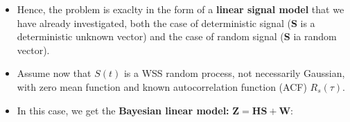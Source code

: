 \begin{itemize}
$$
\underbrace{\left[
\begin{array}{c}
Z_0 \\
Z_1 \\
Z_2 \\
\vdots \\
Z_{N-1}
\end{array}
\right]}_{\mathbf{Z}}
=
\underbrace{\left[
\begin{array}{cccccc}
h_0 & 0 & \cdots & \cdots & 0 & 0 \\
h_1 & h_0 & 0 & \cdots & \cdots & 0 \\
h_2 & h_1 & h_0 & 0 & \cdots & 0 \\
\vdots & h_2 & h_1 & \ddots & & \vdots \\
h_{N_h-1} & \vdots & \ddots & \ddots & h_0 & 0 \\
0 & h_{N_h-1} & & \ddots & h_1 & h_0 \\
\vdots & 0 & h_{N_h-1} & \cdots & h_2 & h_1 \\
\vdots & \vdots & 0 & \ddots & \vdots & h_2 \\
0 & 0 & \cdots & 0 & 0 & h_{N_h-1}
\end{array}
\right]}_{\underset{N \times N_s}{\mathbf{H}}}
\underbrace{\left[
\begin{array}{c}
S_0 \\
S_1 \\
\vdots \\
S_{N_s-1}
\end{array}
\right]}_{\mathbf{S}}
+
\underbrace{\left[
\begin{array}{c}
W_0 \\
W_1 \\
\vdots \\
W_{N-1}
\end{array}
\right]}_{\mathbf{W}}
$$
$$
\mathbf{Z} = \mathbf{H} \cdot \mathbf{S} + \mathbf{W}, \quad \text{where } N = N_s + N_h - 1 > N_s
$$
\item Hence, the problem is exaclty in the form of a \textbf{linear signal model} that we have already investigated, both the case of deterministic signal (\textbf{S} is a deterministic unknown vector) and the case of random signal (\textbf{S} ia random vector).
\item Assume now that \(S(t)\) is a WSS random process, not necessarily Gaussian, with zero mean function and known autocorrelation function (ACF) \(R_s(\tau)\).
\item In this case, we get the \textbf{Bayesian linear model:} \(\mathbf{Z=HS+W}\):
\begin{align*}

\end{align*}
\end{itemize}
